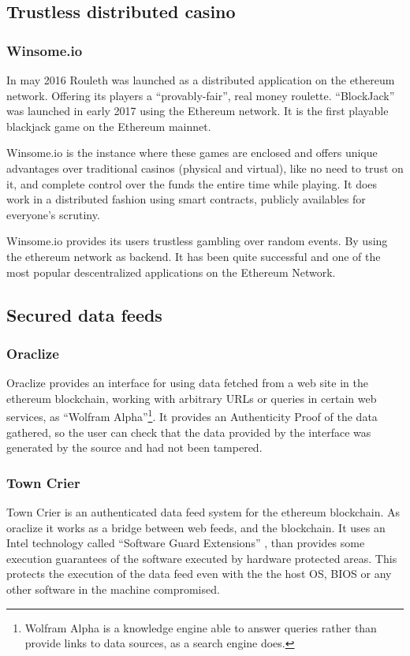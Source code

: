 \subsection{Trustless distributed casino}

\subsubsection{Winsome.io}
In may 2016 Rouleth \cite{winsomeio} was launched as a distributed application
  on the ethereum network. Offering its players a ``provably-fair'', real money
  roulette.
``BlockJack'' was launched in early 2017 using the Ethereum network.
It is the first playable blackjack game on the Ethereum mainnet.

Winsome.io is the instance where these games are enclosed and offers unique
  advantages over traditional casinos (physical and virtual), like no need to
  trust on it, and complete control over the funds the entire time while
  playing.
It does work in a distributed fashion using smart contracts, publicly availables
  for everyone's scrutiny.

Winsome.io provides its users trustless gambling over random events.
By using the ethereum network as backend.
It has been quite successful and one of the most popular descentralized
  applications on the Ethereum Network.

\subsection{Secured data feeds}

\subsubsection{Oraclize}
Oraclize \cite{oraclizeit} provides an interface for using data fetched from a
  web site in the ethereum blockchain, working with arbitrary URLs or queries
  in certain web services, as ``Wolfram Alpha''\footnote{Wolfram Alpha is a
  knowledge engine able to answer queries rather than provide links to data
  sources, as a search engine does.}.
It provides an Authenticity Proof of the data gathered, so the user can check
  that the data provided by the interface was generated by the source and had
  not been tampered.

\subsubsection{Town Crier}
Town Crier \cite{zhang2016town} is an authenticated data feed system for
  the ethereum blockchain.
As oraclize it works as a bridge between web feeds, and the blockchain.
It uses an Intel technology called ``Software Guard Extensions''
  \cite{costan2016intel}, than provides some execution guarantees of the software
  executed by hardware protected areas.
This protects the execution of the data feed even with the the host OS, BIOS or
  any other software in the machine compromised.
